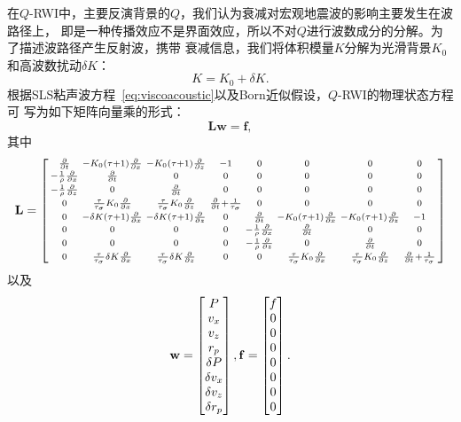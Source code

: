 在$Q$-RWI中，主要反演背景的$Q$，我们认为衰减对宏观地震波的影响主要发生在波路径上，
即是一种传播效应不是界面效应，所以不对$Q$进行波数成分的分解。为了描述波路径产生反射波，携带
衰减信息，我们将体积模量$K$分解为光滑背景$K_0$和高波数扰动$\delta K$：
\begin{equation}
	K = K_0 + \delta K.
\end{equation}
根据SLS粘声波方程~\ref{eq:viscoacoustic}以及Born近似假设，$Q$-RWI的物理状态方程可
写为如下矩阵向量乘的形式：
\begin{equation}
    \mathbf{L}\mathbf{w} = \mathbf{f},
    \label{eq:state}
\end{equation}
其中
    \begin{eqnarray*}
        \mathbf{L}= 
        \begin{bmatrix}
            \begin{smallmatrix}
            \frac{\partial}{\partial t} &-K_0(\tau +1)\frac{\partial}{\partial x}
            &-K_0(\tau +1)\frac{\partial}{\partial z} &-1 &0 &0 &0 &0\cr
            -\frac{1}{\rho}\frac{\partial}{\partial x} &\frac{\partial}{\partial t} &0
            &0 &0 &0 &0 &0\cr
            -\frac{1}{\rho}\frac{\partial}{\partial z} &0 &\frac{\partial}{\partial t}
            &0 &0 &0 &0 &0\cr
            0 & \frac{\tau}{\tau_\sigma}K_0\frac{\partial}{\partial x}
            &\frac{\tau}{\tau_\sigma}K_0\frac{\partial}{\partial z}
            &\frac{\partial}{\partial t}+\frac{1}{\tau_\sigma} &0 &0 &0 &0 \cr
            0 &-\delta K(\tau+1)\frac{\partial}{\partial x} &-\delta
            K(\tau+1)\frac{\partial}{\partial z} &0 &\frac{\partial}{\partial t}
            &-K_0(\tau +1)\frac{\partial}{\partial x} &-K_0(\tau
            +1)\frac{\partial}{\partial z} &-1 \cr
            0 &0 &0 &0 &-\frac{1}{\rho}\frac{\partial}{\partial x}
            &\frac{\partial}{\partial t} &0 &0\cr
            0 &0 &0 &0 &-\frac{1}{\rho}\frac{\partial}{\partial z} &0
            &\frac{\partial}{\partial t} &0\cr
            0 &\frac{\tau}{\tau_\sigma}\delta K\frac{\partial}{\partial x}
            &\frac{\tau}{\tau_\sigma}\delta K\frac{\partial}{\partial z} &0 &0 
            & \frac{\tau}{\tau_\sigma}K_0\frac{\partial}{\partial x}
            &\frac{\tau}{\tau_\sigma}K_0\frac{\partial}{\partial z}
            &\frac{\partial}{\partial t}+\frac{1}{\tau_\sigma}
            \end{smallmatrix}
        \end{bmatrix}
    \end{eqnarray*}
以及
    \begin{eqnarray*}
        \mathbf{w} = 
        \begin{bmatrix}
            P \cr v_x \cr v_z \cr r_p \cr\delta P \cr\delta v_x \cr\delta v_z
            \cr\delta r_p
        \end{bmatrix},
        \mathbf{f} = 
        \begin{bmatrix}
            f \cr 0\cr 0\cr 0 \cr 0\cr 0 \cr 0\cr 0
        \end{bmatrix}.
    \end{eqnarray*}
